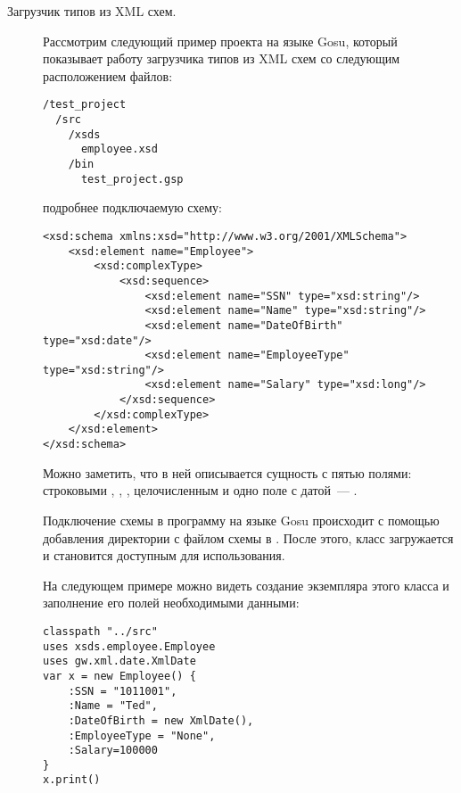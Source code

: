 \begin{description}
\item[Загрузчик типов из XML схем.] Рассмотрим следующий пример проекта на языке Gosu, который показывает работу загрузчика типов из XML схем со следующим расположением файлов:

\begin{lstlisting}[caption={Расположение файлов в примере загрузчиков типов на языке Gosu. \td}, label=gosu-project-layout]
/test_project
  /src
    /xsds
      employee.xsd
    /bin
      test_project.gsp
\end{lstlisting}

 подробнее подключаемую схему:

\begin{lstlisting}[caption={Содержимое файла \texttt{employee.xsd} из примера~\ref{gosu-project-layout}.}, label=gosu-employee-xsd]
<xsd:schema xmlns:xsd="http://www.w3.org/2001/XMLSchema">
    <xsd:element name="Employee">
        <xsd:complexType>
            <xsd:sequence>
                <xsd:element name="SSN" type="xsd:string"/>
                <xsd:element name="Name" type="xsd:string"/>
                <xsd:element name="DateOfBirth" type="xsd:date"/>
                <xsd:element name="EmployeeType" type="xsd:string"/>
                <xsd:element name="Salary" type="xsd:long"/>
            </xsd:sequence>
        </xsd:complexType>
    </xsd:element>
</xsd:schema>
\end{lstlisting}

Можно заметить, что в ней описывается сущность  с пятью полями: строковыми
, , , целочисленным 
и одно поле с датой~--- .

Подключение схемы в программу на языке Gosu происходит с помощью добавления директории с файлом схемы в .
После этого, класс  загружается и становится доступным для использования.

На следующем примере можно видеть создание экземпляра этого класса и заполнение его полей необходимыми данными:

\begin{lstlisting}[caption={Содержимое файла \texttt{test\_project.gsp} из примера~\ref{gosu-project-layout}.}, label=gosu-xsd-loader]
classpath "../src"
uses xsds.employee.Employee
uses gw.xml.date.XmlDate
var x = new Employee() {
    :SSN = "1011001",
    :Name = "Ted",
    :DateOfBirth = new XmlDate(),
    :EmployeeType = "None",
    :Salary=100000
}
x.print()
\end{lstlisting}


\end{description}

